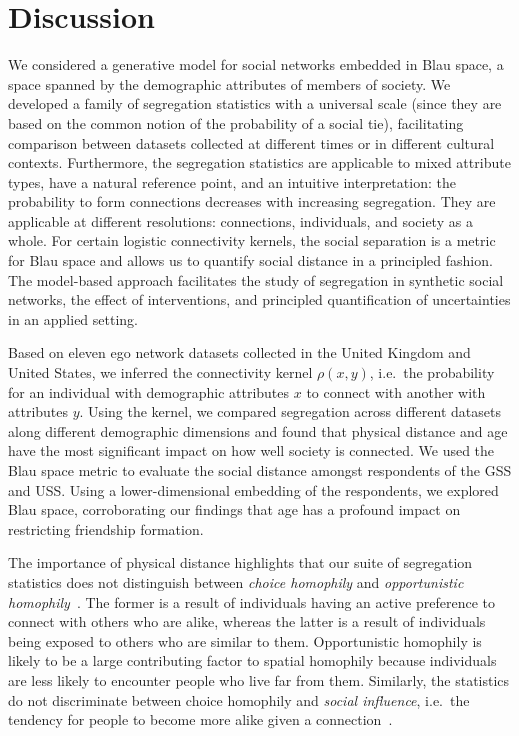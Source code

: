 \documentclass{scrartcl}
\begin{document}
\section{Discussion\label{sec:discussion}}

We considered a generative model for social networks embedded in Blau space, a space spanned by the demographic attributes of members of society. We developed a family of segregation statistics with a universal scale (since they are based on the common notion of the probability of a social tie), facilitating comparison between datasets collected at different times or in different cultural contexts. Furthermore, the segregation statistics are applicable to mixed attribute types, have a natural reference point, and an intuitive interpretation: the probability to form connections decreases with increasing segregation. They are applicable at different resolutions: connections, individuals, and society as a whole. For certain logistic connectivity kernels, the social separation is a metric for Blau space and allows us to quantify social distance in a principled fashion. The model-based approach facilitates the study of segregation in synthetic social networks, the effect of interventions, and principled quantification of uncertainties in an applied setting.

Based on eleven ego network datasets collected in the United Kingdom and United States, we inferred the connectivity kernel $\rho(x,y)$, i.e.\ the probability for an individual with demographic attributes $x$ to connect with another with attributes $y$. Using the kernel, we compared segregation across different datasets along different demographic dimensions and found that physical distance and age have the most significant impact on how well society is connected. We used the Blau space metric to evaluate the social distance amongst respondents of the GSS and USS. Using a lower-dimensional embedding of the respondents, we explored Blau space, corroborating our findings that age has a profound impact on restricting friendship formation.

The importance of physical distance highlights that our suite of segregation statistics does not distinguish between \emph{choice homophily} and \emph{opportunistic homophily}~\cite{Franz2010}. The former is a result of individuals having an active preference to connect with others who are alike, whereas the latter is a result of individuals being exposed to others who are similar to them. Opportunistic homophily is likely to be a large contributing factor to spatial homophily because individuals are less likely to encounter people who live far from them. Similarly, the statistics do not discriminate between choice homophily and \emph{social influence}, i.e.\ the tendency for people to become more alike given a connection~\cite{Shalizi2011}.
\end{document}
